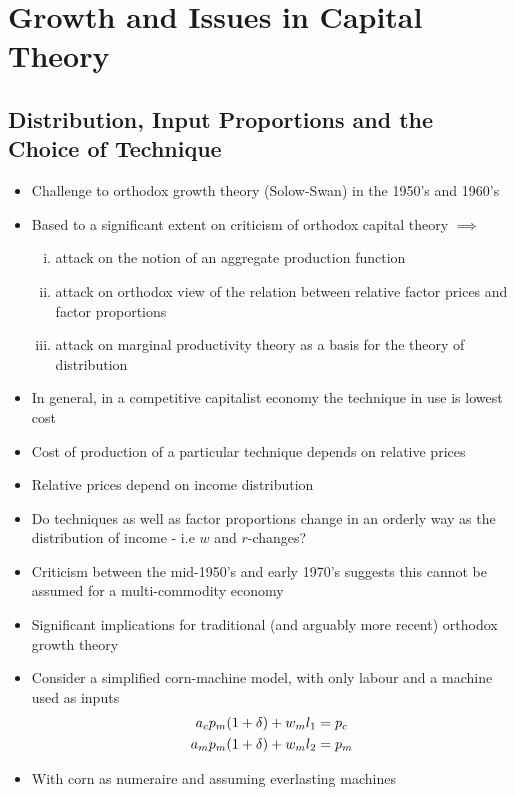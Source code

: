 \documentclass[a4paper,twoside]{article}
\numberwithin{equation}{section}
\numberwithin{figure}{section}
\begin{document}
\section{Growth and Issues in Capital Theory}
\subsection{Distribution, Input Proportions and the Choice of Technique}
	\begin{itemize}
		\item Challenge to orthodox growth theory (Solow-Swan) in the 1950's and 1960's
		\item Based to a significant extent on criticism of orthodox capital theory \( \implies \)
		\begin{enumerate}[(i)]
			\item attack on the notion of an aggregate production function
			\item attack on orthodox view of the relation between relative factor prices and factor proportions
			\item attack on marginal productivity theory as a basis for the theory of distribution
		\end{enumerate}
		\item In general, in a competitive capitalist economy the technique in use is lowest cost
		\item Cost of production of a particular technique depends on relative prices
		\item Relative prices depend on income distribution
		\item Do techniques as well as factor proportions change in an orderly way as the distribution of income - i.e \( w \) and \( r \)-changes?
		\item Criticism between the mid-1950's and early 1970's suggests this cannot be assumed for a multi-commodity economy
		\item Significant implications for traditional (and arguably more recent) orthodox growth theory
		\item Consider a simplified corn-machine model, with only labour and a machine used as inputs
		\begin{align}
			a_c p_m (1 + \delta) + w_m l_1 &= p_c \notag \\
			a_m p_m (1 + \delta) + w_m l_2 &= p_m \label{eq:5.1}
		\end{align}
		\item With corn as numeraire and assuming everlasting machines
		\begin{align}

\end{align}
\end{itemize}
\end{document}

